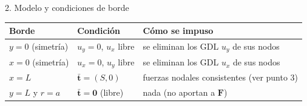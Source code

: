 \begin{desarrollo}{2. Modelo y condiciones de borde}
\begin{center}
\renewcommand{\arraystretch}{1.2}
\begin{tabular}{@{}lll@{}}
\toprule
Borde & Condici\'on & C\'omo se impuso \\
\midrule
$y=0$ (simetr\'ia) & $u_y=0$, $u_x$ libre & se eliminan los GDL $u_y$ de sus nodos \\
$x=0$ (simetr\'ia) & $u_x=0$, $u_y$ libre & se eliminan los GDL $u_x$ de sus nodos \\
$x=L$ & $\bar{\mathbf{t}}=(S,0)$ & fuerzas nodales consistentes (ver punto 3) \\
$y=L$ y $r=a$ & $\bar{\mathbf{t}}=\mathbf{0}$ (libre) & nada (no aportan a $\mathbf{F}$) \\
\bottomrule
\end{tabular}
\end{center}
\end{desarrollo}


